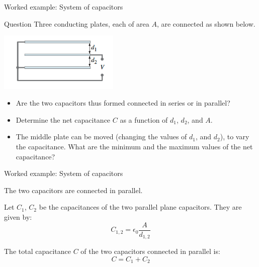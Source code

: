 %
%

{
\problemslide

%
%
%

\begin{frame}{Worked example: System of capacitors}

  \begin{blockexmplque}{Question}
    Three conducting plates, each of area $A$, are connected as shown below.
    \begin{center}
      \includegraphics[width=0.43\textwidth]{./images/problems/lect04_3_plane_capacitor}\\
    \end{center}
    \begin{itemize}
      \item Are the two capacitors thus formed connected in series or in parallel?
      \item Determine the net capacitance $C$ as a function of $d_1$, $d_2$, and $A$.
      \item The middle plate can be moved (changing the values of $d_1$, and $d_2$),
      to vary the capacitance. What are the minimum and the maximum values of the net capacitance?
    \end{itemize}
  \end{blockexmplque}

\end{frame}

%
%
%

\begin{frame}{Worked example: System of capacitors}

  The two capacitors are connected in parallel.\\
  \vspace{0.2cm}

  Let $C_1$, $C_2$ be the capacitances of the two parallel plane capacitors.
  They are given by:
  \begin{equation*}
    C_{1,2} = \epsilon_0 \frac{A}{d_{1,2}}
  \end{equation*}

  The total capacitance $C$ of the two capacitors connected in parallel is:
  \begin{equation*}
    C = C_1 + C_2
  \end{equation*}


\end{frame}}
